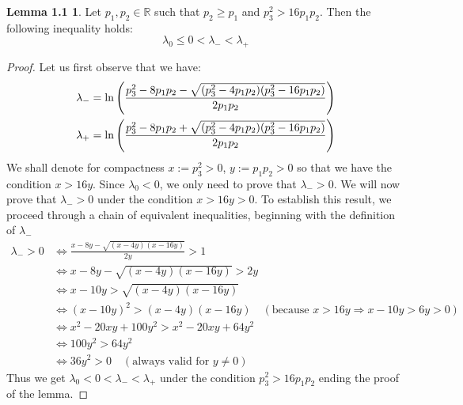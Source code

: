 \documentclass[a4paper, 10pt]{article}
\newcommand{\bea}{\begin{eqnarray}}
\newcommand{\eea}{\end{eqnarray}}
\theoremstyle{definition}
\begin{document}
\newtheorem*{manuallemma}{Lemma 1.1}
\begin{manuallemma}
\label{lemma:lambda_ordering}
Let $p_1, p_2 \in \mathbb{R}$ such that $p_2 \geq p_1$ and $p_3^2>16p_1p_2$. Then the following inequality holds:
\[
\lambda_0 \leq 0 <\lambda_- <   \lambda_+
\]
\end{manuallemma}
\begin{proof}Let us first observe that we have:
\bea \lambda_{-}= \ln\left(\frac{p_3^2-8p_1p_2 - \sqrt{(p_3^2-4p_1p_2)(p_3^2-16p_1p_2)}}{2p_1p_2}\right) \cr \lambda_{+} =\ln\left(\frac{p_3^2-8p_1p_2 +  \sqrt{(p_3^2-4p_1p_2)(p_3^2-16p_1p_2)}}{2p_1p_2}\right) \eea
We shall denote for compactness $x := p_3^2>0$, $y := p_1p_2>0$ so that we have the condition $x>16y$. Since $\lambda_0<0$, we only need to prove that $\lambda_->0$. We will now prove that $\lambda_{-} > 0$ under the condition $x > 16y>0$. To establish this result, we proceed through a chain of equivalent inequalities, beginning with the definition of $\lambda_{-}$
\begin{align*}
\lambda_{-} > 0 
&\iff \frac{x - 8y - \sqrt{(x-4y)(x-16y)}}{2y} > 1 \\
&\iff x - 8y - \sqrt{(x-4y)(x-16y)} > 2y \\
&\iff x - 10y > \sqrt{(x-4y)(x-16y)} \\
&\iff (x - 10y)^2 > (x-4y)(x-16y) \quad (\text{because } x > 16y \Rightarrow x-10y > 6y > 0) \\
&\iff x^2 - 20xy + 100y^2 > x^2 - 20xy + 64y^2 \\
&\iff 100y^2 > 64y^2 \\
&\iff 36y^2 > 0 \quad (\text{always valid for  } y \neq 0)
\end{align*}
Thus we get  $\lambda_0 < 0 <\lambda_- <   \lambda_+$ under the condition $p_3^2>16p_1p_2$ ending the proof of the lemma.  
\end{proof}
\end{document}
